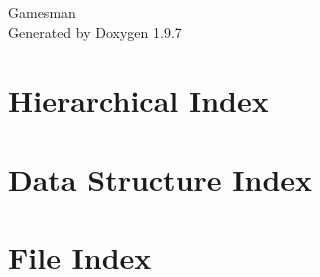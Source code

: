 \documentclass[twoside]{book}
\newcommand{\+}{\discretionary{\mbox{\scriptsize$\hookleftarrow$}}{}{}}
\newcommand{\clearemptydoublepage}{%
    \newpage{\pagestyle{empty}\cleardoublepage}%
  }
\begin{document}
  \raggedbottom
    \hypersetup{pageanchor=false,
                bookmarksnumbered=true,
                pdfencoding=unicode
               }
  \begin{titlepage}
  \vspace*{7cm}
  \begin{center}%
  {\Large Gamesman}\\
  \vspace*{1cm}
  {\large Generated by Doxygen 1.9.7}\\
  \end{center}
  \end{titlepage}
  \clearemptydoublepage
  \tableofcontents
  \clearemptydoublepage
  \hypersetup{pageanchor=true}
\chapter{Hierarchical Index}

\chapter{Data Structure Index}

\chapter{File Index}

\end{document}
